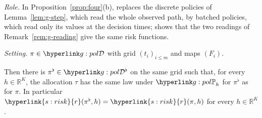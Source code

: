 \documentclass[11pt]{article}
\DeclareRobustCommand{\sy}[2]{{\hyperlink{#1}{#2}}}
\newcommand{\R}{\mathbb{R}}
\newcommand{\1}{\mathbf{1}}
\newcommand{\rk}{\sy{s:risk}{r}}
\begin{document}
\begin{lemma}\label{lem:g-bridge}
\textit{Role.} In Proposition~\ref{prop:four}(b), replaces the discrete policies of Lemma~\ref{lem:g-step}, which read the whole observed path, by batched policies,
which read only its values at the decision times; shows that the two readings of Remark~\ref{rem:g-reading} give the same risk functions.

\noindent\textit{Setting.} $\pi\in\gDc$ with grid $(t_i)_{i\le m}$ and maps $(F_i)$.

\noindent Then there is $\pi^\flat\in\gBc$ on the same grid such that, for every $h\in\R^K$, the allocation $\tau$ has the same law under $\gPh_h$ for $\pi^\flat$ as for
$\pi$. In particular $\rk(\pi^\flat,h)=\rk(\pi,h)$ for every $h\in\R^K$.
\end{lemma}
\end{document}
